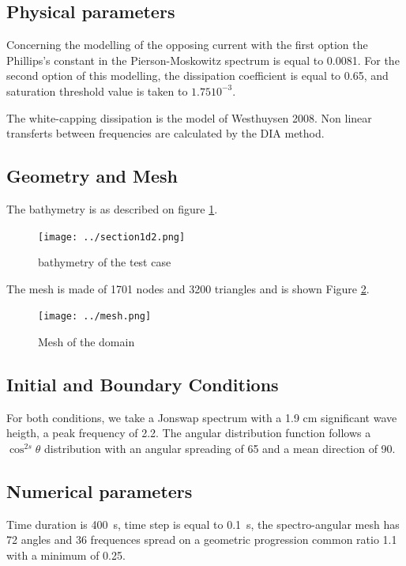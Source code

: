 \subsection{Physical parameters}
 Concerning the modelling of the opposing current with the first option the Phillips’s constant in the Pierson-Moskowitz spectrum is equal to 0.0081.
For the second option of this modelling, the dissipation coefficient is equal to 0.65, and saturation threshold value is taken to $1.75 10^{-3}$.

The white-capping dissipation is the model of Westhuysen 2008. Non linear transferts between frequencies are calculated by the DIA method.

%
%
%
\subsection{Geometry and Mesh}
%
The bathymetry is as described on figure \ref{bathyop}.
\begin{figure} [!h]
\centering
\texttt{[image: ../section1d2.png]}
 \caption{bathymetry of the test case }
\label{bathyop}
\end{figure}

The mesh is made of 1701 nodes and 3200 triangles  and is shown Figure \ref{mailop}.
\begin{figure} [!h]
\centering
\texttt{[image: ../mesh.png]}
 \caption{Mesh of the domain}
\label{mailop}
\end{figure}



%
%
\subsection{Initial and Boundary Conditions}
%
For both conditions, we take a Jonswap spectrum with a 1.9 cm significant wave heigth, a peak frequency of 2.2. The angular distribution function follows a $\cos^{2s} \theta$ distribution with an angular spreading of 65 and a mean direction of 90.
%
%
\subsection{Numerical parameters}
%
Time duration is 400~s, time step is equal to 0.1~s, the spectro-angular mesh has 72 angles and 36 frequences spread on a geometric progression common ratio 1.1 with a minimum of 0.25.

